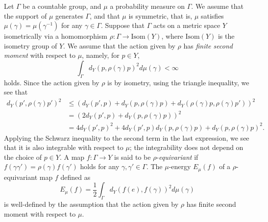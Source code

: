 \documentclass[12pt]{amsart}
\numberwithin{equation}{section}
\theoremstyle{plain}
\theoremstyle{definition}
\theoremstyle{remark}
\newcommand{\ene}[1]{E_{#1}}
\newcommand{\isom}[1]{\mathrm{Isom}({#1})}
\begin{document}
%
% 
Let $\Gamma$ be a countable group, and $\mu$ a probability
measure on $\Gamma$.
We assume that the support of $\mu$ generates $\Gamma$, 
and that $\mu$ is symmetric, that is, 
$\mu$ satisfies $\mu(\gamma)=\mu(\gamma^{-1})$ for any 
$\gamma \in \Gamma$.
Suppose that $\Gamma$ acts on a metric space $Y$ isometrically via a
homomorphism $\rho\colon \Gamma \rightarrow \isom{Y}$, where $\isom{Y}$
is the isometry group of $Y$. 
We assume that the action given by $\rho$ has 
{\it finite second moment} with respect to $\mu$, namely, for $p\in Y$, 
\begin{equation*}
 \int_{\Gamma} d_Y(p, \rho(\gamma)p)^2 d\mu(\gamma) < \infty
\end{equation*}
holds. 
Since the action given by $\rho$ is by isometry, using the triangle
inequality, we see that
\begin{equation*}
\begin{split}
  d_Y(p', \rho(\gamma)p')^2 
 & \leq \left(d_Y(p',p) + d_Y(p,\rho(\gamma)p) + d_Y(\rho(\gamma)p,
       \rho(\gamma)p')\right)^2 \\
 & = \left(2d_Y(p',p) + d_Y(p,\rho(\gamma)p) \right)^2 \\
 & = 4d_Y(p',p)^2 + 4d_Y(p',p)d_Y(p,\rho(\gamma)p) + 
      d_Y(p,\rho(\gamma)p)^2. 
\end{split}
\end{equation*}
Applying the Schwarz inequality to the second term in the last
expression, we see that it is also integrable with respect to $\mu$; the
integrability does not depend on the choice of $p \in Y$. 
A map $f \colon \Gamma \rightarrow Y$ is said to be 
$\rho$-{\it equivariant} if $f(\gamma \gamma')=\rho(\gamma)f(\gamma')$
holds for any $\gamma, \gamma' \in \Gamma$. 
The $\mu$-energy $\ene{\mu}(f)$ of a $\rho$-equivariant map $f$ defined
as
\begin{equation*}
 \ene{\mu}(f) = \frac{1}{2} \int_{\Gamma} d_Y(f(e), f(\gamma))^2
d\mu(\gamma)
\end{equation*}
is well-defined by the assumption that the action given by $\rho$ has
finite second moment with respect to $\mu$.
\end{document}
